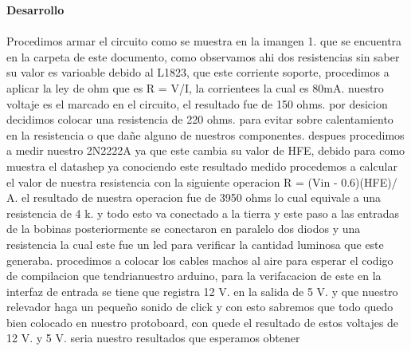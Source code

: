 \documentclass[12pt]{report}
\begin{document}
{\huge \textbf{Desarrollo}\\}\\
{\large Procedimos armar el circuito como se muestra en la imangen 1. que se encuentra
en la carpeta de este documento,
como observamos ahi dos resistencias sin saber su valor es varioable debido
al L1823, que este corriente soporte, procedimos a aplicar la ley de ohm que
es R = V/I, la corrientees la cual es 80mA. nuestro voltaje es el marcado en
el circuito, el resultado fue de 150 ohms. por desicion decidimos colocar una
resistencia de 220 ohms. para evitar sobre calentamiento en la resistencia o que
dañe alguno de nuestros componentes.
despues procedimos a medir nuestro 2N2222A ya que este cambia su valor
de HFE, debido para como muestra el datashep ya conociendo este resultado
medido procedemos a calcular el valor de nuestra resistencia con la siguiente
operacion R = (Vin - 0.6)(HFE)/ A. el resultado de nuestra operacion fue de
3950 ohms lo cual equivale a una resistencia de 4 k. y todo esto va conectado a
la tierra y este paso a las entradas de la bobinas posteriormente se conectaron
en paralelo dos diodos y una resistencia la cual este fue un led para verificar la
cantidad luminosa que este generaba. procedimos a colocar los cables machos
al aire para esperar el codigo de compilacion que tendrianuestro arduino, para
la verifacacion de este en la interfaz de entrada se tiene que registra 12 V. en
la salida de 5 V. y que nuestro relevador haga un pequeño sonido de click y
con esto sabremos que todo quedo bien colocado en nuestro protoboard, con
quede el resultado de estos voltajes de 12 V. y 5 V. seria nuestro resultados que
esperamos obtener}\\
\end{document}
